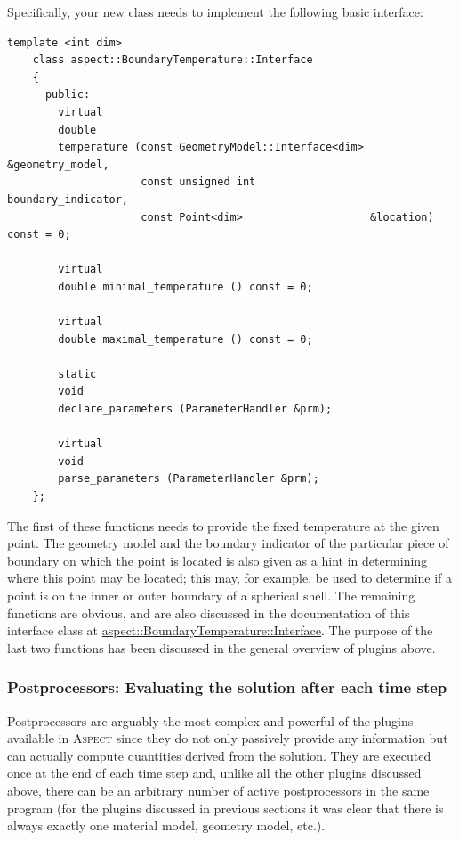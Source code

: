 \documentclass{article}
\newcommand{\aspect}{\textsc{Aspect}}
\begin{document}
Specifically, your new class needs to implement the following basic interface:
\begin{lstlisting}[frame=single]
    template <int dim>
    class aspect::BoundaryTemperature::Interface
    {
      public:
        virtual
        double
        temperature (const GeometryModel::Interface<dim> &geometry_model,
                     const unsigned int                   boundary_indicator,
                     const Point<dim>                    &location) const = 0;

        virtual
        double minimal_temperature () const = 0;

        virtual
        double maximal_temperature () const = 0;

        static
        void
        declare_parameters (ParameterHandler &prm);

        virtual
        void
        parse_parameters (ParameterHandler &prm);
    };
\end{lstlisting}
The first of these functions needs to provide the fixed temperature at the
given point. The geometry model and the boundary indicator of the particular
piece of boundary on which the point is located is also given as a hint in
determining where this point may be located; this may, for example, be used to
determine if a point is on the inner or outer boundary of a spherical
shell. The remaining functions are obvious, and are also
discussed in the documentation of this interface class at
\href{doc/doxygen/classaspect_1_1BoundaryTemperature_1_1Interface.html}{aspect::BoundaryTemperature::Interface}. The
purpose
of the last two functions has been discussed in the general overview of
plugins above.


\subsubsection{Postprocessors: Evaluating the solution after each time step}

Postprocessors are arguably the most complex and powerful of the plugins
available in \aspect{} since they do not only passively provide any
information but can actually compute quantities derived from the
solution. They are executed once at the end of each time step and,
unlike all the other plugins discussed above, there can be an arbitrary number
of active postprocessors in the same program (for the plugins discussed in
previous sections it was clear that there is always exactly one material
model, geometry model, etc.).
\end{document}
